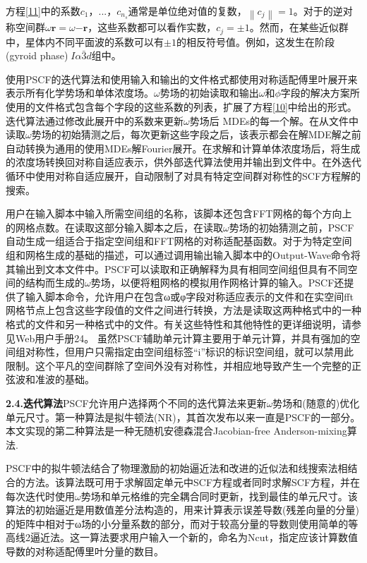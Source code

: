 \documentclass[12pt，a4paper]{article}
\numberwithin{equation}{section}
\begin{document}
方程\ref{11}中的系数$c_1，...，c_{n_s}$通常是单位绝对值的复数，$\left\|c_j\right\|=1$。对于的逆对称空间群$\omega{\mathbf{r}}=\omega{\mathbf{-r}}$，这些系数都可以看作实数，$c_j=\pm 1$。然而，在某些近似群中，星体内不同平面波的系数可以有$\pm 1$的相反符号值。例如，这发生在阶段(gyroid phase)的̅$I\alpha \bar{3} d$组中。

使用PSCF的迭代算法和使用输入和输出的文件格式都使用对称适配傅里叶展开来表示所有化学势场和单体浓度场。$\omega$势场的初始读取和输出$\omega$和$\phi$字段的解决方案所使用的文件格式包含每个字段的这些系数的列表，扩展了方程\ref{10}中给出的形式。迭代算法通过修改此展开中的系数来更新$\omega$势场后
MDEs的每一个解。在从文件中读取$\omega$势场的初始猜测之后，每次更新这些字段之后，该表示都会在解MDE解之前自动转换为通用的使用MDEs解Fourier展开。在求解和计算单体浓度场后，将生成的浓度场转换回对称自适应表示，供外部迭代算法使用并输出到文件中。在外迭代循环中使用对称自适应展开，自动限制了对具有特定空间群对称性的SCF方程解的搜索。

用户在输入脚本中输入所需空间组的名称，该脚本还包含FFT网格的每个方向上的网格点数。在读取这部分输入脚本之后，在读取$\omega$势场的初始猜测之前，PSCF自动生成一组适合于指定空间组和FFT网格的对称适配基函数。对于为特定空间组和网格生成的基础的描述，可以通过调用输出输入脚本中的Output-Wave命令将其输出到文本文件中。PSCF可以读取和正确解释为具有相同空间组但具有不同空间的结构而生成的$\omega$势场，以便将粗网格的模拟用作网格计算的输入。PSCF还提供了输入脚本命令，允许用户在包含ω或φ字段对称适应表示的文件和在实空间fft网格节点上包含这些字段值的文件之间进行转换，方法是读取这两种格式中的一种格式的文件和另一种格式中的文件。有关这些特性和其他特性的更详细说明，请参见Web用户手册24。
虽然PSCF辅助单元计算主要用于单元计算，并具有强加的空间组对称性，但用户只需指定由空间组标签“i”标识的标识空间组，就可以禁用此限制。这个平凡的空间群除了空间外没有对称性，并相应地导致产生一个完整的正弦波和准波的基础。

\textbf{2.4.迭代算法}PSCF允许用户选择两个不同的迭代算法来更新$\omega$势场和(随意的)优化单元尺寸。第一种算法是拟牛顿法(NR)，其首次发布以来一直是PSCF的一部分。本文实现的第二种算法是一种无随机安德森混合Jacobian-free
Anderson-mixing算法.

PSCF中的拟牛顿法结合了物理激励的初始逼近法和改进的近似法和线搜索法相结合的方法。该算法既可用于求解固定单元中SCF方程或者同时求解SCF方程，并在每次迭代时使用$\omega$势场和单元格维的完全耦合同时更新，找到最佳的单元尺寸。该算法的初始逼近是用数值差分法构造的，用来计算表示误差导数(残差向量的分量)的矩阵中相对于ω场的小分量系数的部分，而对于较高分量的导数则使用简单的等高线2逼近法。这一算法要求用户输入一个新的，命名为Ncut，指定应该计算数值导数的对称适配傅里叶分量的数目。
\end{document}
